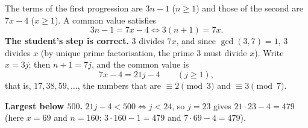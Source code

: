 The terms of the first progression are $3n-1$ ($n\ge1$) and those of the second are $7x-4$ ($x\ge1$). A common value satisfies
\[
3n-1=7x-4\iff 3(n+1)=7x .
\]
\textbf{The student's step is correct.} $3$ divides $7x$, and since $\gcd(3,7)=1$, $3$ divides $x$ (by unique prime factorisation, the prime $3$ must divide $x$). Write $x=3j$; then $n+1=7j$, and the common value is
\[
7x-4=21j-4\qquad(j\ge1),
\]
that is, $17,38,59,\dots$, the numbers that are $\equiv2\pmod3$ and $\equiv3\pmod7$.

\textbf{Largest below $500$.} $21j-4<500\iff j<24$, so $j=23$ gives $21\cdot23-4=\boxed{479}$ (here $x=69$ and $n=160$: $3\cdot160-1=479$ and $7\cdot69-4=479$).
